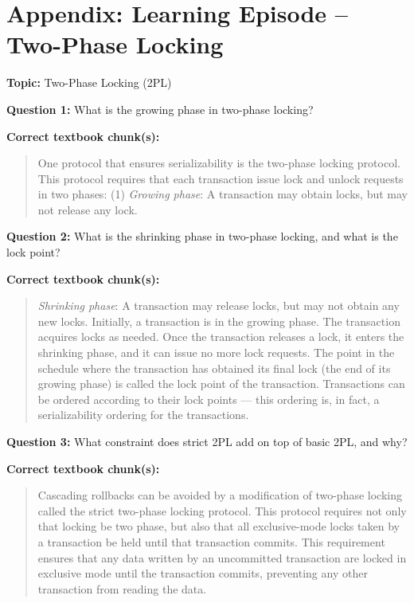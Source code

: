 \documentclass[sigconf,11pt]{acmart}
\begin{document}
\section*{Appendix: Learning Episode -- Two-Phase Locking}

\textbf{Topic:} Two-Phase Locking (2PL)

\bigskip

\noindent\textbf{Question 1:} What is the growing phase in two-phase locking?

\smallskip
\noindent\textbf{Correct textbook chunk(s):}
\begin{quote}
One protocol that ensures serializability is the two-phase locking protocol.
This protocol requires that each transaction issue lock and unlock requests in
two phases: (1) \textit{Growing phase}: A transaction may obtain locks, but may
not release any lock.
\end{quote}

\bigskip

\noindent\textbf{Question 2:} What is the shrinking phase in two-phase locking,
and what is the lock point?

\smallskip
\noindent\textbf{Correct textbook chunk(s):}
\begin{quote}
\textit{Shrinking phase}: A transaction may release locks, but may not obtain
any new locks. Initially, a transaction is in the growing phase. The transaction
acquires locks as needed. Once the transaction releases a lock, it enters the
shrinking phase, and it can issue no more lock requests. The point in the
schedule where the transaction has obtained its final lock (the end of its
growing phase) is called the lock point of the transaction. Transactions can be
ordered according to their lock points --- this ordering is, in fact, a
serializability ordering for the transactions.
\end{quote}

\bigskip

\noindent\textbf{Question 3:} What constraint does strict 2PL add on top of
basic 2PL, and why?

\smallskip
\noindent\textbf{Correct textbook chunk(s):}
\begin{quote}
Cascading rollbacks can be avoided by a modification of two-phase locking called
the strict two-phase locking protocol. This protocol requires not only that
locking be two phase, but also that all exclusive-mode locks taken by a
transaction be held until that transaction commits. This requirement ensures that
any data written by an uncommitted transaction are locked in exclusive mode until
the transaction commits, preventing any other transaction from reading the data.
\end{quote}
\end{document}
